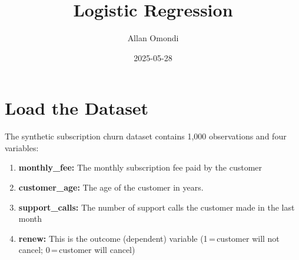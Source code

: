 \documentclass[
]{article}
\title{Logistic Regression}
\author{Allan Omondi}
\date{2025-05-28}
\newenvironment{Shaded}{\begin{snugshade}}{\end{snugshade}}
\newcommand{\AttributeTok}[1]{\textcolor[rgb]{0.13,0.29,0.53}{#1}}
\newcommand{\ConstantTok}[1]{\textcolor[rgb]{0.56,0.35,0.01}{#1}}
\newcommand{\ControlFlowTok}[1]{\textcolor[rgb]{0.13,0.29,0.53}{\textbf{#1}}}
\newcommand{\FunctionTok}[1]{\textcolor[rgb]{0.13,0.29,0.53}{\textbf{#1}}}
\newcommand{\NormalTok}[1]{#1}
\newcommand{\SpecialCharTok}[1]{\textcolor[rgb]{0.81,0.36,0.00}{\textbf{#1}}}
\newcommand{\StringTok}[1]{\textcolor[rgb]{0.31,0.60,0.02}{#1}}
\begin{document}
\maketitle

{
\setcounter{tocdepth}{4}
\tableofcontents
}
\begin{Shaded}
\end{Shaded}

\section{Load the Dataset}\label{load-the-dataset}

The synthetic subscription churn dataset contains 1,000 observations and
four variables:

\begin{enumerate}
\def\labelenumi{\arabic{enumi}.}
\item
  \textbf{monthly\_fee:} The monthly subscription fee paid by the
  customer
\item
  \textbf{customer\_age:} The age of the customer in years.
\item
  \textbf{support\_calls:} The number of support calls the customer made
  in the last month
\item
  \textbf{renew:} This is the outcome (dependent) variable
  (1\,=\,customer will not cancel; 0\,=\,customer will cancel)
\end{enumerate}
\end{document}
